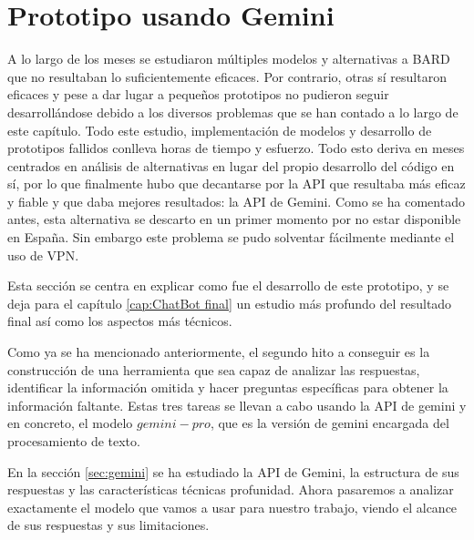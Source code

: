 \section{Prototipo usando Gemini}
\label{protogemini}
A lo largo de los meses se estudiaron múltiples modelos y alternativas a BARD que no resultaban lo suficientemente eficaces. Por contrario, otras sí resultaron eficaces y pese a dar lugar a pequeños prototipos no pudieron seguir desarrollándose debido a los diversos problemas que se han contado a lo largo de este capítulo. Todo este estudio, implementación de modelos y desarrollo de prototipos fallidos conlleva horas de tiempo y esfuerzo. Todo esto deriva en meses centrados en análisis de alternativas en lugar del propio desarrollo del código en sí, por lo que finalmente hubo que decantarse por la API que resultaba más eficaz y fiable y que daba mejores resultados: la API de Gemini. Como se ha comentado antes, esta alternativa se descarto en un primer momento por no estar disponible en España. Sin embargo este problema se pudo solventar fácilmente mediante el uso de VPN. 

Esta sección se centra en explicar como fue el desarrollo de este prototipo, y se deja para el capítulo \ref{cap:ChatBot final} un estudio más profundo del resultado final así como los aspectos más técnicos.

Como ya se ha mencionado anteriormente, el segundo hito a conseguir es la construcción de una herramienta que sea capaz de analizar las respuestas, identificar la información omitida y hacer preguntas específicas para obtener la información faltante. Estas tres tareas se llevan a cabo usando la API de gemini y en concreto, el modelo $gemini-pro$, que es la versión de gemini encargada del procesamiento de texto. 

En la sección \ref{sec:gemini} se ha estudiado la API de Gemini, la estructura de sus respuestas y las características técnicas profunidad. Ahora pasaremos a analizar exactamente el modelo que vamos a usar para nuestro trabajo, viendo el alcance de sus respuestas y sus limitaciones. 

